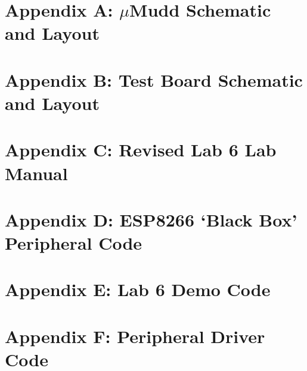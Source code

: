 \documentclass[12pt]{article}
\begin{document}
\newpage
\section*{Appendix A: $\mu$Mudd Schematic and Layout}
\clearpage
\section*{Appendix B: Test Board Schematic and Layout}
\clearpage
\section*{Appendix C: Revised Lab 6 Lab Manual}
\clearpage
\section*{Appendix D: ESP8266 `Black Box' Peripheral Code}
\clearpage
\section*{Appendix E: Lab 6 Demo Code}
\clearpage
\section*{Appendix F: Peripheral Driver Code}
\clearpage
\end{document}
